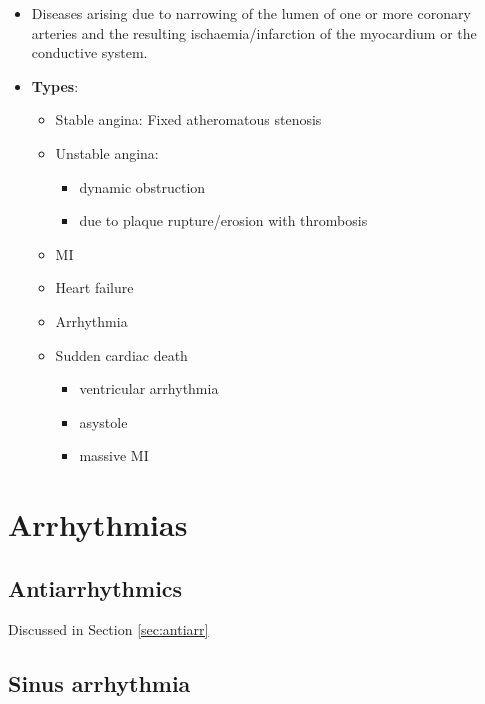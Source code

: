 \documentclass[
  12pt,
]{memoir}
\providecommand{\tightlist}{%
  \setlength{\itemsep}{0pt}\setlength{\parskip}{0pt}}
\begin{document}
\begin{itemize}
\tightlist
\item
  Diseases arising due to narrowing of the lumen of one or more coronary
  arteries and the resulting ischaemia/infarction of the myocardium or
  the conductive system.
\item
  \textbf{Types}:

  \begin{itemize}
  \tightlist
  \item
    Stable angina: Fixed atheromatous stenosis
  \item
    Unstable angina:

    \begin{itemize}
    \tightlist
    \item
      dynamic obstruction
    \item
      due to plaque rupture/erosion with thrombosis
    \end{itemize}
  \item
    MI
  \item
    Heart failure
  \item
    Arrhythmia
  \item
    Sudden cardiac death

    \begin{itemize}
    \tightlist
    \item
      ventricular arrhythmia
    \item
      asystole
    \item
      massive MI
    \end{itemize}
  \end{itemize}
\end{itemize}

\hypertarget{arrhythmias}{%
\section{Arrhythmias}\label{arrhythmias}}

\hypertarget{antiarrhythmics}{%
\subsection{Antiarrhythmics}\label{antiarrhythmics}}

Discussed in Section \ref{sec:antiarr}

\hypertarget{sinus-arrhythmia}{%
\subsection{Sinus arrhythmia}\label{sinus-arrhythmia}}
\end{document}
